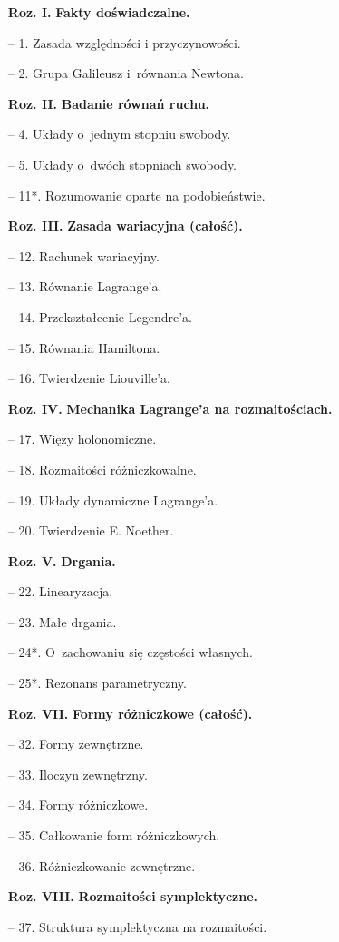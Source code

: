 \documentclass[a4paper,11pt]{article}
\begin{document}
\begin{itemize}
\item[\textbf{Roz. I.}] \textbf{Fakty doświadczalne.}
\item[--] 1. Zasada względności i przyczynowości.
\item[--] 2. Grupa Galileusz i~równania Newtona.
\item[\textbf{Roz. II.}] \textbf{Badanie równań ruchu.}
\item[--] 4. Układy o~jednym stopniu swobody.
\item[--] 5. Układy o~dwóch stopniach swobody.
\item[--] 11*. Rozumowanie oparte na podobieństwie.
\item[\textbf{Roz. III.}] \textbf{Zasada wariacyjna (całość).}
\item[--] 12. Rachunek wariacyjny.
\item[--] 13. Równanie Lagrange'a.
\item[--] 14. Przekształcenie Legendre'a.
\item[--] 15. Równania Hamiltona.
\item[--] 16. Twierdzenie Liouville'a.
\item[\textbf{Roz. IV.}] \textbf{Mechanika Lagrange'a na
    rozmaitościach.}
\item[--] 17. Więzy holonomiczne.
\item[--] 18. Rozmaitości różniczkowalne.
\item[--] 19. Układy dynamiczne Lagrange'a.
\item[--] 20. Twierdzenie E. Noether.
\item[\textbf{Roz. V.}] \textbf{Drgania.}
\item[--] 22. Linearyzacja.
\item[--] 23. Małe drgania.
\item[--] 24*. O~zachowaniu się częstości własnych.
\item[--] 25*. Rezonans parametryczny.
\item[\textbf{Roz. VII.}] \textbf{Formy różniczkowe (całość).}
\item[--] 32. Formy zewnętrzne.
\item[--] 33. Iloczyn zewnętrzny.
\item[--] 34. Formy różniczkowe.
\item[--] 35. Całkowanie form różniczkowych.
\item[--] 36. Różniczkowanie zewnętrzne.
\item[\textbf{Roz. VIII.}] \textbf{Rozmaitości symplektyczne.}
\item[--] 37. Struktura symplektyczna na rozmaitości.

\end{itemize}
\end{document}

